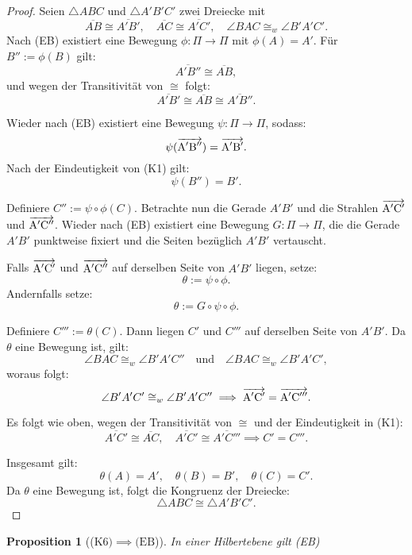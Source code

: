 \documentclass[a4paper,12pt]{article}
\theoremstyle{break}
\newtheorem{proposition}[definition]{Proposition}
\begin{document}
\begin{proof}
Seien \(\triangle ABC\) und \(\triangle A'B'C'\) zwei Dreiecke mit 
\[
\overline{AB} \cong \overline{A'B'}, \quad \overline{AC} \cong \overline{A'C'}, \quad \angle BAC \cong_w \angle B'A'C'.
\]
Nach (EB) existiert eine Bewegung \(\phi: \Pi \to \Pi\) mit \(\phi(A) = A'\). Für \(B'' := \phi(B)\) gilt:
\[
\overline{A'B''} \cong \overline{AB},
\]
und wegen der Transitivität von \(\cong\) folgt:
\[
\overline{A'B'} \cong \overline{AB} \cong \overline{A'B''}.
\]

Wieder nach (EB) existiert eine Bewegung \(\psi: \Pi \to \Pi\), sodass:
\[
\psi(\overrightarrow{\rm A'B''}) = \overrightarrow{\rm A'B'}.
\]
Nach der Eindeutigkeit von (K1) gilt:
\[
\psi(B'') = B'.
\]

Definiere \(C'' := \psi \circ \phi(C)\). Betrachte nun die Gerade \(A'B'\) und die Strahlen \(\overrightarrow{\rm A'C'}\) und \(\overrightarrow{\rm A'C''}\). Wieder nach (EB) existiert eine Bewegung \(G: \Pi \to \Pi\), die die Gerade \(A'B'\) punktweise fixiert und die Seiten bezüglich \(A'B'\) vertauscht.

Falls \(\overrightarrow{\rm A'C'}\) und \(\overrightarrow{\rm A'C''}\) auf derselben Seite von \(A'B'\) liegen, setze:
\[
\theta := \psi \circ \phi.
\]
Andernfalls setze:
\[
\theta := G \circ \psi \circ \phi.
\]

Definiere \(C''' := \theta(C)\). Dann liegen \(C'\) und \(C'''\) auf derselben Seite von \(A'B'\). Da \(\theta\) eine Bewegung ist, gilt:
\[
\angle BAC \cong_w \angle B'A'C'' \quad \text{und} \quad \angle BAC \cong_w \angle B'A'C',
\]
woraus folgt:
\[
\angle B'A'C' \cong_w \angle B'A'C'' \implies \overrightarrow{\rm A'C'} = \overrightarrow{\rm A'C'''}.
\]

Es folgt wie oben, wegen der Transitivität von \(\cong\) und der Eindeutigkeit in (K1):
\[
\overline{A'C'} \cong \overline{AC}, \quad \overline{A'C'} \cong \overline{A'C'''} \implies C' = C'''.
\]

Insgesamt gilt:
\[
\theta(A) = A', \quad \theta(B) = B', \quad \theta(C) = C'.
\]
Da \(\theta\) eine Bewegung ist, folgt die Kongruenz der Dreiecke:
\[
\triangle ABC \cong \triangle A'B'C'.
\]
\end{proof}

\begin{proposition}[(\(\text{K6}) \implies (\text{EB}\))]
In einer Hilbertebene gilt (EB)
\end{proposition}
\end{document}
